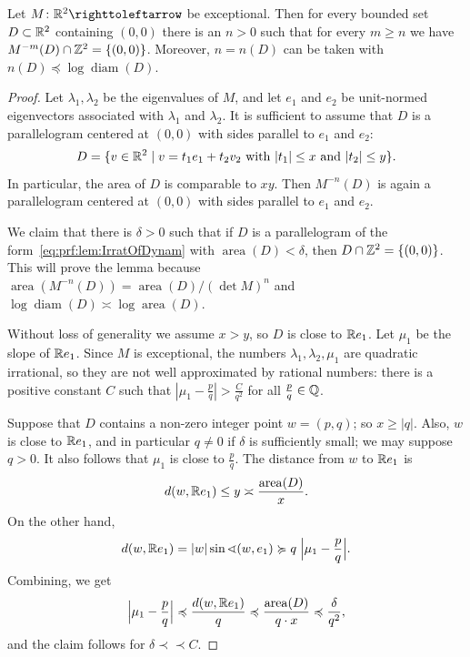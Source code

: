 \documentclass{amsart}
\begin{document}
\begin{lem}\label{lem:IrratOfDynam}
  Let $M\colon\R^2\selfmap$ be exceptional. Then for every bounded set
  $D\subset{\mathbb R}^2$ containing $(0,0)$ there is an $n>0$ such that for
  every $m\ge n$ we have $M^{-m}(D)\cap{\mathbb Z}^2=\{(0,0)\}$. Moreover,
  $n=n(D)$ can be taken with
  $n(D)\preccurlyeq \log \operatorname{diam}(D)$.
\end{lem}
\begin{proof}
  Let $\lambda_1, \lambda_2$ be the eigenvalues of $M$, and let $e_1$
  and $e_2$ be unit-normed eigenvectors associated with $\lambda_1$
  and $\lambda_2$.  It is sufficient to assume that $D$ is a
  parallelogram centered at $(0,0)$ with sides parallel to $e_1$ and
  $e_2$:
  \begin{equation}\label{eq:prf:lem:IrratOfDynam}
    D =\{v\in {\mathbb R}^2\mid v= t_1e_1+t_2v_2\text{ with }|t_1|\le x\text{ and }|t_2|\le y\}.
  \end{equation}
  In particular, the area of $D$ is comparable to $x y$. Then
  $M^{-n}(D)$ is again a parallelogram centered at $(0,0)$ with sides
  parallel to $e_1$ and $e_2$.

  We claim that there is $\delta>0$ such that if $D$ is a
  parallelogram of the form~\eqref{eq:prf:lem:IrratOfDynam} with
  $\operatorname{area}(D)<\delta$, then $D\cap {\mathbb Z}^2=\{(0,0)\}$. This
  will prove the lemma because
  $\operatorname{area}(M^{-n}(D))=\operatorname{area}(D)/(\det M)^n$
  and $\log\operatorname{diam}(D)\asymp\log\operatorname{area}(D)$.

  Without loss of generality we assume $x>y$, so $D$ is close to
  ${\mathbb R} e_1$. Let $\mu_1$ be the slope of ${\mathbb R} e_1 $. Since $M$ is
  exceptional, the numbers $\lambda_1,\lambda_2,\mu_1$ are quadratic
  irrational, so they are not well approximated by rational numbers:
  there is a positive constant $C$ such that
  $|\mu_1-\frac p q |> \frac{C}{q^2}$ for all $\frac p q\in {\mathbb Q}$.

  Suppose that $D$ contains a non-zero integer point $w=(p,q)$; so
  $x\ge|q|$. Also, $w$ is close to ${\mathbb R} e_1$, and in particular
  $q\neq 0$ if $\delta$ is sufficiently small; we may suppose
  $q>0$. It also follows that $\mu_1$ is close to $\frac p q$.  The
  distance from $w$ to ${\mathbb R} e_1$ is
  \[d(w,{\mathbb R} e_1)\le y\asymp \frac{\operatorname{area}(D)}{x}.
  \]
  On the other hand,
  \[d(w,{\mathbb R} e_1)=|w| \sin \sphericalangle(w,e_1) \succcurlyeq q\;\Big| \mu_1- \frac p q\Big|.\]
  Combining, we get
  \[\Big|\mu_1 - \frac p q\Big|\preccurlyeq\frac{d(w,{\mathbb R} e_1)}{q}\preccurlyeq\frac{\operatorname{area}(D)}{q\cdot x}\preccurlyeq\frac{\delta}{q^2},
  \]
  and the claim follows for $\delta\prec\!\!\prec C$.
\end{proof}
\end{document}
